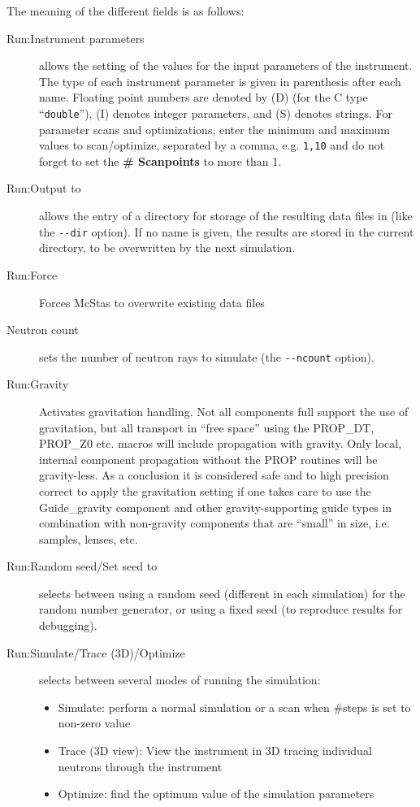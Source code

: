 The meaning of the different fields is as follows:
\begin{description}
\item[Run:Instrument parameters] allows the setting of the values for the input
  parameters of the instrument. The type of each instrument parameter is given
  in parenthesis after each name. Floating point numbers are denoted by (D) (for
  the C type ``\verb+double+''), (I) denotes integer parameters, and (S) denotes
  strings. For parameter scans and optimizations, enter the minimum and maximum
  values to scan/optimize, separated by a comma, e.g. \verb+1,10+ and do not
  forget to set the {\bf \# Scanpoints} to more than 1.
\item[Run:Output to] allows the entry of a directory for storage of the
  resulting data files in (like the \verb+--dir+ option). If no name is given,
  the results are stored in the current directory, to be overwritten by the next
  simulation.
\item[Run:Force] Forces McStas to overwrite existing data files
\item[Neutron count] sets the number of neutron rays to
  simulate (the \verb+--ncount+ option).
\item[Run:Gravity] Activates gravitation handling. Not all components full
  support the use of gravitation, but all transport in ``free space'' using the
  PROP\_DT, PROP\_Z0 etc. macros will include propagation with gravity. Only
  local, internal component propagation without the PROP routines will be
  gravity-less. As a conclusion it is considered safe and to high precision
  correct to apply the gravitation setting if one takes care to use the
  Guide\_gravity component and other gravity-supporting guide types in
  combination with non-gravity components that are ``small'' in size,
  i.e. samples, lenses, etc.
\item[Run:Random seed/Set seed to] selects between using a random seed (different
  in each simulation) for the random number generator, or using a fixed
  seed (to reproduce results for debugging).
\item[Run:Simulate/Trace (3D)/Optimize] selects between several modes of
  running the simulation:
  \begin{itemize}
  \item Simulate: perform a normal simulation or a scan when \#steps
    is set to non-zero value
  \item Trace (3D view): View the instrument in 3D tracing individual
    neutrons through the instrument
  \item Optimize: find the optimum value of the simulation parameters

\end{itemize}
\end{description}
